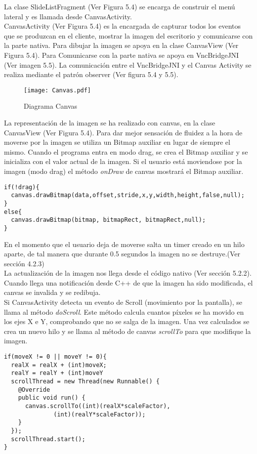 La clase SlideListFragment (Ver Figura 5.4) se encarga de construir el menú lateral y es llamada desde CanvasActivity.\\

CanvasActivity (Ver Figura 5.4) es la encargada de capturar todos los eventos que se produzcan en el cliente, mostrar la imagen del escritorio y comunicarse con la parte nativa. Para dibujar la imagen se apoya en la clase CanvasView (Ver Figura 5.4). Para Comunicarse con la parte nativa se apoya en VncBridgeJNI (Ver imagen 5.5). La comunicación entre el VncBridgeJNI y el Canvas Activity se realiza mediante el patrón observer (Ver figura 5.4 y 5.5).\\

\begin{figure}[h]
\begin{center}
\texttt{[image: Canvas.pdf]}
\end{center}
\caption{Diagrama Canvas}
\end{figure}

La representación de la imagen se ha realizado con canvas, en la clase CanvasView (Ver Figura 5.4). Para dar mejor sensación de fluidez a la hora de moverse por la imagen se utiliza un Bitmap auxiliar en lugar de siempre el mismo. Cuando el programa entra en modo drag, se crea el Bitmap auxiliar y se inicializa con el valor actual de la imagen. Si el usuario está moviendose por la imagen (modo drag) el método \emph{onDraw} de canvas mostrará el Bitmap auxiliar.
\begin{lstlisting}
if(!drag){	
  canvas.drawBitmap(data,offset,stride,x,y,width,height,false,null);
}
else{
  canvas.drawBitmap(bitmap, bitmapRect, bitmapRect,null);
}
\end{lstlisting}
\newpage
En el momento que el usuario deja de moverse salta un timer creado en un hilo aparte, de tal manera que durante 0.5 segundos la imagen no se destruye.(Ver sección 4.2.3)\\

La actualización de la imagen nos llega desde el código nativo (Ver sección 5.2.2). Cuando llega una notificación desde C++ de que la imagen ha sido modificada, el canvas se invalida y se redibuja.\\

Si CanvasActivity detecta un evento de Scroll (movimiento por la pantalla), se llama al método \emph{doScroll}. Este método calcula cuantos píxeles se ha movido en los ejes X e Y, comprobando que no se salga de la imagen. Una vez calculados se crea un nuevo hilo y se llama al método de canvas \emph{scrollTo} para que modifique la imagen.
\begin{lstlisting}
if(moveX != 0 || moveY != 0){
  realX = realX + (int)moveX;
  realY = realY + (int)moveY
  scrollThread = new Thread(new Runnable() {
    @Override
    public void run() {
      canvas.scrollTo((int)(realX*scaleFactor),
		      (int)(realY*scaleFactor));
    }
  });
  scrollThread.start();
}
\end{lstlisting}

